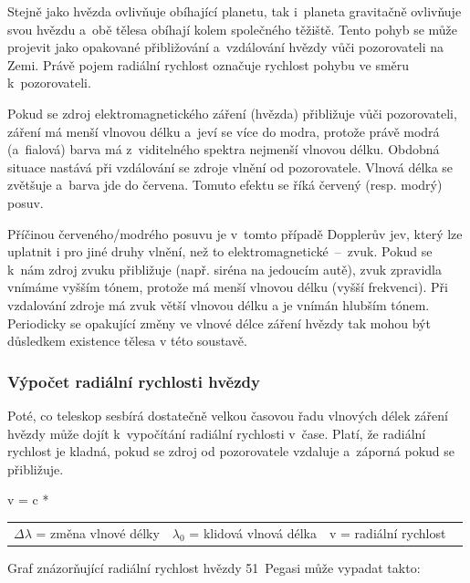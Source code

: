 \documentclass[a4paper,12pt]{article}
\begin{document}
{{Stejně jako hvězda ovlivňuje obíhající planetu, tak i~planeta gravitačně ovlivňuje svou hvězdu a~obě tělesa obíhají kolem společného těžiště. Tento pohyb se může projevit jako opakované přibližování a~vzdálování hvězdy vůči pozorovateli na Zemi. Právě pojem radiální rychlost označuje rychlost pohybu ve směru k~pozorovateli.~\cite{methods}

Pokud se zdroj elektromagnetického záření (hvězda) přibližuje vůči pozorovateli, záření má menší vlnovou délku a~jeví se více do modra, protože právě modrá (a~fialová) barva má z~viditelného spektra nejmenší vlnovou délku. Obdobná situace nastává při vzdálování se zdroje vlnění od pozorovatele. Vlnová délka se zvětšuje a~barva jde do červena. Tomuto efektu se říká červený (resp. modrý) posuv.~\cite{methods}

\drawgimp

Příčinou červeného/modrého posuvu je v~tomto případě Dopplerův jev, který lze uplatnit i pro jiné druhy vlnění, než to elektromagnetické~--~zvuk. Pokud se k~nám zdroj zvuku přibližuje (např. siréna na jedoucím autě), zvuk zpravidla vnímáme vyšším tónem, protože má menší vlnovou délku (vyšší frekvenci). Při vzdalování zdroje má zvuk větší vlnovou délku a je vnímán hlubším tónem.~\cite{radialvelocity} Periodicky se opakující změny ve vlnové délce záření hvězdy tak mohou být důsledkem existence tělesa v této soustavě.~\cite{methods}

\subsubsection{Výpočet radiální rychlosti hvězdy}

Poté, co teleskop sesbírá dostatečně velkou časovou řadu vlnových délek záření hvězdy může dojít k~vypočítání radiální rychlosti v~čase. Platí, že radiální rychlost je kladná, pokud se zdroj od pozorovatele vzdaluje a~záporná pokud se přibližuje.~\cite{methods}

 {v = c * }{
\begin{tabular}{lll}
	$\Delta\lambda$ = změna vlnové délky & $\lambda_0$ = klidová vlnová délka & v = radiální rychlost \
\end{tabular}
}

Graf znázorňující radiální rychlost hvězdy 51~Pegasi může vypadat takto:

\data{1}{51pegasi}

}}
\end{document}
